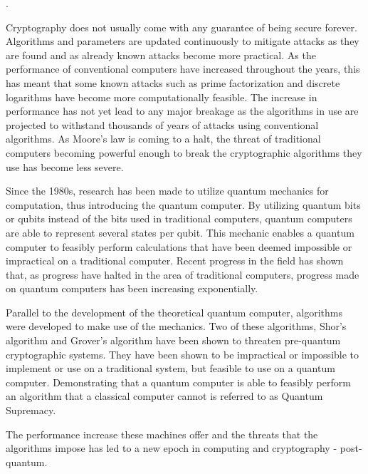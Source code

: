 
.

Cryptography does not usually come with any guarantee of being secure forever. Algorithms and parameters are updated continuously to mitigate attacks as they are found and as already known attacks become more practical\cite{nist2019}. As the performance of conventional computers have increased throughout the years, this has meant that some known attacks such as prime factorization and discrete logarithms have become more computationally feasible. The increase in performance has not yet lead to any major breakage as the algorithms in use are projected to withstand thousands of years of attacks using conventional algorithms\cite{thome2019}. As Moore's law is coming to a halt\cite{theis2017}, the threat of traditional computers becoming powerful enough to break the cryptographic algorithms they use has become less severe.

Since the 1980s, research has been made to utilize quantum mechanics for computation, thus introducing the quantum computer\cite{benioff1980}. By utilizing quantum bits or \glspl{qubit} instead of the bits used in traditional computers, quantum computers are able to represent several states per \gls{qubit}. This mechanic enables a quantum computer to feasibly perform calculations that have been deemed impossible or impractical on a traditional computer\cite{jordan2021}. Recent progress in the field has shown that, as progress have halted in the area of traditional computers, progress made on quantum computers has been increasing exponentially\cite{ibm2020:quantum-computer}.

Parallel to the development of the theoretical quantum computer, algorithms were developed to make use of the mechanics. Two of these algorithms, Shor's algorithm and Grover's algorithm have been shown to threaten pre-quantum cryptographic systems. They have been shown to be impractical or impossible to implement or use on a traditional system, but feasible to use on a quantum computer\cite{shor1997, jordan2021}. Demonstrating that a quantum computer is able to feasibly perform an algorithm that a classical computer cannot is referred to as Quantum Supremacy\cite{farhi2019}.

The performance increase these machines offer and the threats that the algorithms impose has led to a new epoch in computing and cryptography - post-quantum.

